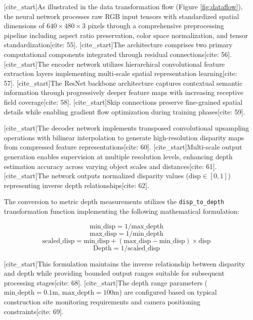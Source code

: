 [cite_start]As illustrated in the data transformation flow (Figure \ref{fig:dataflow}), the neural network processes raw RGB input tensors with standardized spatial dimensions of $640 \times 480 \times 3$ pixels through a comprehensive preprocessing pipeline including aspect ratio preservation, color space normalization, and tensor standardization[cite: 55]. [cite_start]The architecture comprises two primary computational components integrated through residual connections[cite: 56]. [cite_start]The encoder network utilizes hierarchical convolutional feature extraction layers implementing multi-scale spatial representation learning[cite: 57]. [cite_start]The ResNet backbone architecture captures contextual semantic information through progressively deeper feature maps with increasing receptive field coverage[cite: 58]. [cite_start]Skip connections preserve fine-grained spatial details while enabling gradient flow optimization during training phases[cite: 59].

[cite_start]The decoder network implements transposed convolutional upsampling operations with bilinear interpolation to generate high-resolution disparity maps from compressed feature representations[cite: 60]. [cite_start]Multi-scale output generation enables supervision at multiple resolution levels, enhancing depth estimation accuracy across varying object scales and distances[cite: 61]. [cite_start]The network outputs normalized disparity values ($\text{disp} \in [0,1]$) representing inverse depth relationships[cite: 62].

The conversion to metric depth measurements utilizes the \texttt{disp\_to\_depth} transformation function implementing the following mathematical formulation:

\begin{equation}
    \text{min\_disp} = 1 / \text{max\_depth}
\end{equation}
\begin{equation}
    \text{max\_disp} = 1 / \text{min\_depth}
\end{equation}
\begin{equation}
    \text{scaled\_disp} = \text{min\_disp} + (\text{max\_disp} - \text{min\_disp}) \times \text{disp}
\end{equation}
\begin{equation}
    \text{Depth} = 1 / \text{scaled\_disp}
\end{equation}

[cite_start]This formulation maintains the inverse relationship between disparity and depth while providing bounded output ranges suitable for subsequent processing stages[cite: 68]. [cite_start]The depth range parameters ($\text{min\_depth} = 0.1\text{m}$, $\text{max\_depth} = 100\text{m}$) are configured based on typical construction site monitoring requirements and camera positioning constraints[cite: 69].

